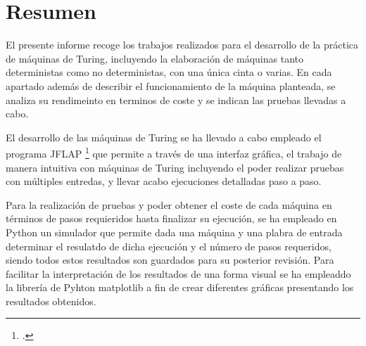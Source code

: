 \part{Resumen}

El presente informe recoge los trabajos realizados para el desarrollo de la práctica de máquinas de Turing, incluyendo la elaboración de máquinas tanto deterministas como no deterministas, con una única cinta o varias. En cada apartado además de describir el funcionamiento de la máquina planteada, se analiza su rendimeinto en terminos de coste y se indican las pruebas llevadas a cabo.\medskip

El desarrollo de las máquinas de Turing se ha llevado a cabo empleado el programa JFLAP \footcite{jflap} que permite a través de una interfaz gráfica, el trabajo de manera intuitiva con máquinas de Turing incluyendo el poder realizar pruebas con múltiples entredas, y llevar acabo ejecuciones detalladas paso a paso.\medskip

Para la realización de pruebas y poder obtener el coste de cada máquina en términos de pasos requieridos hasta finalizar su ejecución, se ha empleado en Python un simulador que permite dada una máquina y una plabra de entrada determinar el resulatdo de dicha ejecución y el número de pasos requeridos, siendo todos estos resultados son guardados para su posterior revisión. Para facilitar la interpretación de los resultados de una forma visual se ha empleaddo la librería de Pyhton matplotlib a fin de crear diferentes gráficas presentando los resultados obtenidos.
